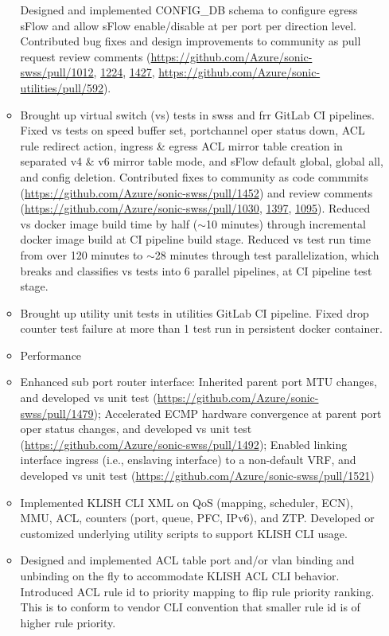 \documentclass[letterpaper,11pt]{article}
\newcommand{\resitem}[1]{\item #1 \vspace{-2pt}}
\begin{document}
\begin{itemize}
\begin{itemize}
{  Designed and implemented CONFIG\_DB schema to configure egress sFlow and allow sFlow enable/disable at per port per direction level.
  Contributed bug fixes and design improvements to community as pull request review comments (\url{https://github.com/Azure/sonic-swss/pull/1012},
  \url{1224}, \url{1427},
  \url{https://github.com/Azure/sonic-utilities/pull/592}).}
  \resitem{Brought up virtual switch (vs) tests in swss and frr GitLab CI pipelines.
  Fixed vs tests on speed buffer set, portchannel oper status down, ACL rule redirect action,
  ingress \& egress ACL mirror table creation in separated v4 \& v6 mirror table mode, and sFlow default global, global all, and config deletion.
  Contributed fixes to community as code commmits (\url{https://github.com/Azure/sonic-swss/pull/1452}) and review comments
  (\url{https://github.com/Azure/sonic-swss/pull/1030}, \url{1397}, \url{1095}).
  Reduced vs docker image build time by half ({\tt $\sim$}10 minutes) through incremental docker image build at CI pipeline build stage.
  Reduced vs test run time from over 120 minutes to {\tt $\sim$}28 minutes through test parallelization,
  which breaks and classifies vs tests into 6 parallel pipelines, at CI pipeline test stage.}
  \resitem{Brought up utility unit tests in utilities GitLab CI pipeline.
  Fixed drop counter test failure at more than 1 test run in persistent docker container.}
  \resitem{Performance}
  \resitem{Enhanced sub port router interface: Inherited parent port MTU changes, and developed vs unit test
  (\url{https://github.com/Azure/sonic-swss/pull/1479});
  Accelerated ECMP hardware convergence at parent port oper status changes, and developed vs unit test
  (\url{https://github.com/Azure/sonic-swss/pull/1492});
  Enabled linking interface ingress (i.e., enslaving interface) to a non-default VRF, and developed vs unit test
  (\url{https://github.com/Azure/sonic-swss/pull/1521})}
  \resitem{Implemented KLISH CLI XML on QoS (mapping, scheduler, ECN), MMU, ACL, counters (port, queue, PFC, IPv6), and ZTP.
  Developed or customized underlying utility scripts to support KLISH CLI usage.}
  \resitem{Designed and implemented ACL table port and/or vlan binding and unbinding on the fly to accommodate KLISH ACL CLI behavior.
  Introduced ACL rule id to priority mapping to flip rule priority ranking.
  This is to conform to vendor CLI convention that smaller rule id is of higher rule priority.}
  \end{itemize}


\end{itemize}
\end{document}

